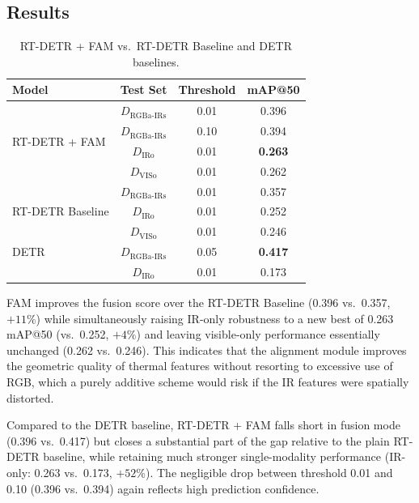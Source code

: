 \documentclass[12pt, a4paper]{article}
\begin{document}
\subsection{Results}

\begin{table}[htbp]
\centering
\caption{RT-DETR + FAM vs.\ RT-DETR Baseline and DETR baselines.}
\label{tab:fam_results}
\begin{tabular}{lccc}
\toprule
\textbf{Model} & \textbf{Test Set} & \textbf{Threshold} & \textbf{mAP@50} \\
\midrule
\multirow{4}{*}{RT-DETR + FAM}
    & $D_{\text{RGBa-IRs}}$ & 0.01 & 0.396 \\
    & $D_{\text{RGBa-IRs}}$ & 0.10 & 0.394 \\
    & $D_{\text{IRo}}$      & 0.01 & \textbf{0.263} \\
    & $D_{\text{VISo}}$     & 0.01 & 0.262 \\
\midrule
\multirow{3}{*}{RT-DETR Baseline}
    & $D_{\text{RGBa-IRs}}$ & 0.01 & 0.357 \\
    & $D_{\text{IRo}}$      & 0.01 & 0.252 \\
    & $D_{\text{VISo}}$     & 0.01 & 0.246 \\
\midrule
DETR & $D_{\text{RGBa-IRs}}$ & 0.05 & \textbf{0.417} \\
     & $D_{\text{IRo}}$      & 0.01 & 0.173 \\
\bottomrule
\end{tabular}
\end{table}

FAM improves the fusion score over the RT-DETR Baseline (0.396 vs.\ 0.357, $+11\%$) while simultaneously raising IR-only robustness to a new best of 0.263 mAP@50 (vs.\ 0.252, $+4\%$) and leaving visible-only performance essentially unchanged (0.262 vs.\ 0.246). This indicates that the alignment module improves the geometric quality of thermal features without resorting to excessive use of RGB, which a purely additive scheme would risk if the IR features were spatially distorted.

Compared to the DETR baseline, RT-DETR + FAM falls short in fusion mode (0.396 vs.\ 0.417) but closes a substantial part of the gap relative to the plain RT-DETR baseline, while retaining much stronger single-modality performance (IR-only: 0.263 vs.\ 0.173, $+52\%$). The negligible drop between threshold 0.01 and 0.10 (0.396 vs.\ 0.394) again reflects high prediction confidence.

\newpage 
\end{document}
